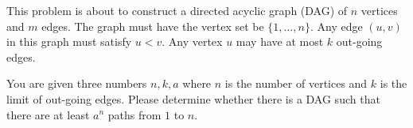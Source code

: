 This problem is about to construct a directed acyclic graph (DAG) of $n$ vertices and $m$ edges.
The graph must have the vertex set be $\{1,\ldots,n\}$. Any edge $(u,v)$ in this graph must satisfy $u < v$.
Any vertex $u$ may have at most $k$ out-going edges.

You are given three numbers $n,k,a$ where $n$ is the number of vertices and $k$ is the limit of out-going edges.
Please determine whether there is a DAG such that there are at least $a^n$ paths from $1$ to $n$.
